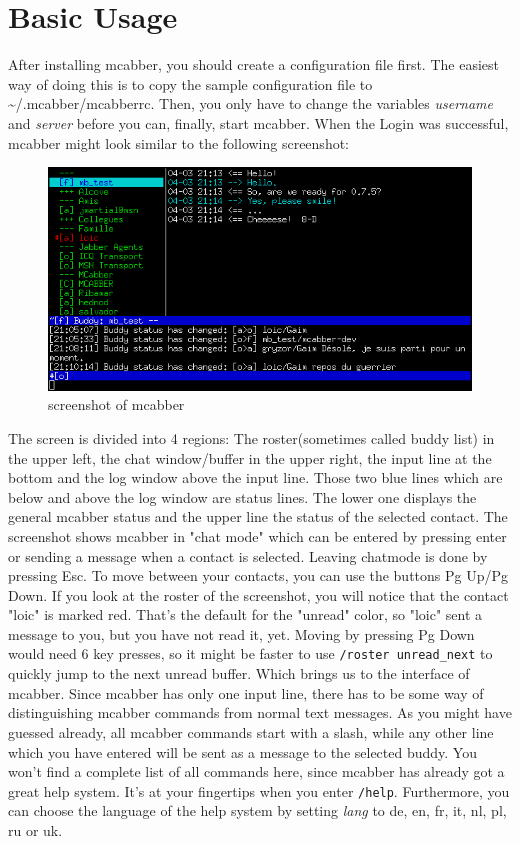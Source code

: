 \documentclass[12pt,oneside,a4]{book}
\begin{document}
\chapter{Basic Usage}
After installing mcabber, you should create a configuration file first. The easiest way of doing this
is to copy the sample configuration file\cite{samplerc} to \~{}/.mcabber/mcabberrc. Then, you only have to change the variables
\textit{username} and \textit{server} before you can, finally, start mcabber. When the Login was successful,
mcabber might look similar to the following screenshot:\\
\begin{figure}[h!]
	\centering
	\includegraphics[scale=0.8]{guide}
	\caption{screenshot of mcabber}
	\label{fig:screenshot}
\end{figure}
The screen is divided into 4 regions: The roster(sometimes called buddy list) in the upper left,
the chat window/buffer in the upper right, the input line at the bottom and the log window above the
input line. Those two blue lines which are below and above the log window are status lines. The lower one
displays the general mcabber status and the upper line the status of the selected contact.
The screenshot shows mcabber in "chat mode" which can be entered by pressing enter or sending a message
when a contact is selected. Leaving chatmode is done by pressing Esc. To move between your contacts, you
can use the buttons Pg Up/Pg Down. If you look at the roster of the screenshot, you will notice that the
contact "loic" is marked red. That's the default for the "unread" color, so "loic" sent a message to
you, but you have not read it, yet. Moving by pressing Pg Down would need 6 key presses, so it might be faster to use
\verb+/roster unread_next+ to quickly jump to the next unread buffer. Which brings us to the interface of mcabber.
Since mcabber has only one input line, there has to be some way of distinguishing mcabber commands from normal text
messages. As you might have guessed already, all mcabber commands start with a slash, while any other line which you
have entered will be sent as a message to the selected buddy. You won't find a complete list of all commands here,
since mcabber has already got a great help system. It's at your fingertips when you enter \verb+/help+.
Furthermore, you can choose the language of the help system by setting \textit{lang} to de, en, fr, it, nl, pl, ru or uk.
\end{document}
